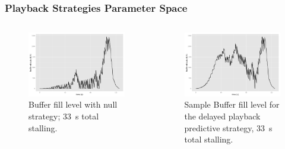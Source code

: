 \documentclass{beamer}
\begin{document}
\begin{frame}
	\frametitle{Playback Strategies Parameter Space}
	\begin{columns}[T]
		\begin{figure}
			\includegraphics[width=1.0\columnwidth]{../../chapters/03-streaming/images/R-bufferlevel-stall.pdf}
			\caption{Buffer fill level with null strategy; \SI{33}{\second} total stalling.}
		\end{figure}

		\begin{figure}
			\includegraphics[width=1.0\columnwidth]{../../chapters/03-streaming/images/R-bufferlevel-startdelay.pdf}
			\caption{Sample Buffer fill level for the delayed playback predictive strategy, \SI{33}{\second} total stalling.}
		\end{figure}
	\end{columns}
\end{frame}
\end{document}
